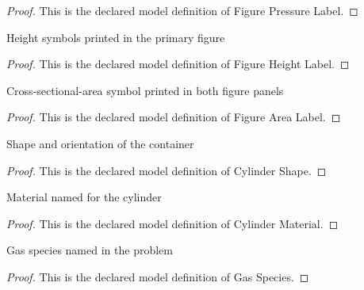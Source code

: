 \begin{proof}
  This is the declared model definition of Figure Pressure Label.
\end{proof}
\begin{definition}
  \label{def:physics:phyx-mini-0360:phyxminiproblems-problemphyxmini0360-figureheightlabel}
  Height symbols printed in the primary figure
\end{definition}
\begin{proof}
  This is the declared model definition of Figure Height Label.
\end{proof}
\begin{definition}
  \label{def:physics:phyx-mini-0360:phyxminiproblems-problemphyxmini0360-figurearealabel}
  Cross-sectional-area symbol printed in both figure panels
\end{definition}
\begin{proof}
  This is the declared model definition of Figure Area Label.
\end{proof}
\begin{definition}
  \label{def:physics:phyx-mini-0360:phyxminiproblems-problemphyxmini0360-cylindershape}
  Shape and orientation of the container
\end{definition}
\begin{proof}
  This is the declared model definition of Cylinder Shape.
\end{proof}
\begin{definition}
  \label{def:physics:phyx-mini-0360:phyxminiproblems-problemphyxmini0360-cylindermaterial}
  Material named for the cylinder
\end{definition}
\begin{proof}
  This is the declared model definition of Cylinder Material.
\end{proof}
\begin{definition}
  \label{def:physics:phyx-mini-0360:phyxminiproblems-problemphyxmini0360-gasspecies}
  Gas species named in the problem
\end{definition}
\begin{proof}
  This is the declared model definition of Gas Species.
\end{proof}
